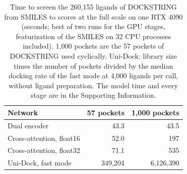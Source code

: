 \begin{table}[t]
\caption{Time to screen the 260{,}155 ligands of DOCKSTRING from SMILES to scores at the full scale on one RTX 4090 (seconds; best of two runs for the GPU stages, featurization of the SMILES on 32 CPU processes included). 1{,}000 pockets are the 57 pockets of DOCKSTRING used cyclically. Uni-Dock: library size times the number of pockets divided by the median docking rate of the fast mode at 4{,}000 ligands per call, without ligand preparation. The model time and every stage are in the Supporting Information.}
\label{tab:cost}
\centering
\footnotesize
\setlength{\tabcolsep}{4pt}
\begin{tabular}{lrr}
\toprule
Network & 57 pockets & 1{,}000 pockets \\
\midrule
Dual encoder & 43.3 & 43.5 \\
Cross-attention, float16 & 52.0 & 197 \\
Cross-attention, float32 & 71.1 & 535 \\
Uni-Dock, fast mode & 349{,}204 & 6{,}126{,}390 \\
\bottomrule
\end{tabular}
\end{table}
